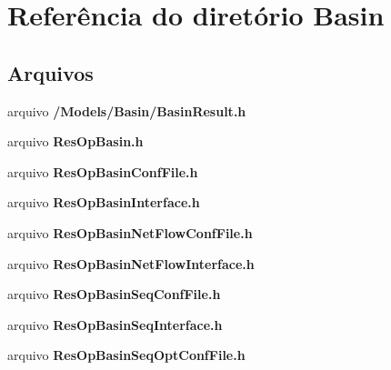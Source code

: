 \section{Referência do diretório Basin}
\label{dir_a799994c1c555e8c0ec5a3ce5f0b97eb}
\subsection*{Arquivos}
\begin{DoxyCompactItemize}
\item 
arquivo {\bf /\+Models/\+Basin/\+Basin\+Result.\+h}
\item 
arquivo {\bf Res\+Op\+Basin.\+h}
\item 
arquivo {\bf Res\+Op\+Basin\+Conf\+File.\+h}
\item 
arquivo {\bf Res\+Op\+Basin\+Interface.\+h}
\item 
arquivo {\bf Res\+Op\+Basin\+Net\+Flow\+Conf\+File.\+h}
\item 
arquivo {\bf Res\+Op\+Basin\+Net\+Flow\+Interface.\+h}
\item 
arquivo {\bf Res\+Op\+Basin\+Seq\+Conf\+File.\+h}
\item 
arquivo {\bf Res\+Op\+Basin\+Seq\+Interface.\+h}
\item 
arquivo {\bf Res\+Op\+Basin\+Seq\+Opt\+Conf\+File.\+h}
\end{DoxyCompactItemize}
